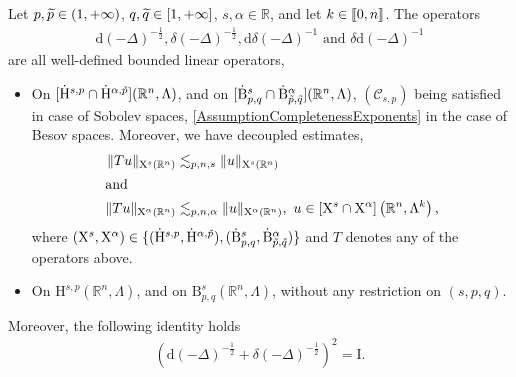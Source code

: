 \documentclass[AHL,Unicode,longabstracts,published]{cedram}
\newcommand{\bbR}{\mathbb{R}}
\newcommand{\rmH}{\mathrm{H}}%
\newcommand{\rmB}{\mathrm{B}}
\newcommand{\rmd}{\mathrm{d}}
\newcommand{\rmX}{\mathrm{X}}
\newcommand{\rmI}{\mathrm{I}}
\newcommand{\clC}{\mathcal{C}}
\newcommand{\llbracket}{\mathopen{[\mkern -2.7mu[}}
\newcommand{\rrbracket}{\mathclose{]\mkern -2.7mu]}}
\newcommand{\llb}{\llbracket}
\newcommand{\rrb}{\rrbracket}
\let\oldtilde\tilde
\renewcommand*{\tilde}[1]{\mathchoice{\widetilde{#1}}{\widetilde{#1}}{\oldtilde{#1}}{\oldtilde{#1}}}
\begin{document}
\begin{prop}\label{prop:RiesTransformHodgeRn}
Let $p,\Tilde{p}\in(1,+\infty)$, $q,\Tilde{q}\in[1,+\infty]$, $s,\alpha\in\bbR$, and let $k\in\llb 0,n\rrb$. The operators
\begin{align*}
\rmd(-\Delta)^{-\frac{1}{2}}, \delta(-\Delta)^{-\frac{1}{2}}, \rmd\delta(-\Delta)^{-1} \text{ and } \delta\rmd(-\Delta)^{-1}
\end{align*}
are all well-defined bounded linear operators,
\begin{itemize}
\item On $[\dot{\rmH}^{s,p}\cap \dot{\rmH}^{\alpha,\tilde{p}}](\bbR^n,\Lambda)$, and on $[\dot{\rmB}^{s}_{p,q}\cap \dot{\rmB}^{\alpha}_{\tilde{p},\tilde{q}}](\bbR^n,\Lambda)$, $(\clC_{s,p})$ being satisfied in case of Sobolev spaces, \eqref{AssumptionCompletenessExponents} in the case of Besov spaces. Moreover, we have decoupled estimates,
\begin{align*}
\| T u \|_{\rmX^s(\bbR^n)} &\lesssim_{p,n,s} \| u \|_{\rmX^s(\bbR^n)}\\
\intertext{and} 
\| T u \|_{\rmX^\alpha(\bbR^n)} &\lesssim_{p,n,\alpha} \| u \|_{\rmX ^\alpha(\bbR^n)}\text{, }\, u\in [\rmX^s\cap \rmX^\alpha]\left(\bbR^n,\Lambda^k\right)\text{,}
\end{align*}
where $(\rmX^s, \rmX^\alpha) \in\{ (\dot{\rmH}^{s,p},\dot{\rmH}^{\alpha,\tilde{p}}), (\dot{\rmB}^{s}_{p,q},\dot{\rmB}^{\alpha}_{\tilde{p},\tilde{q}})\}$ and $T$ denotes any of the operators above.
\item On ${\rmH}^{s,p}(\bbR^n,\Lambda)$, and on ${\rmB}^{s}_{p,q}(\bbR^n,\Lambda)$, without any restriction on $(s,p,q)$.
\end{itemize}
Moreover, the following identity holds
\begin{align*}
\left(\rmd(-\Delta)^{-\frac{1}{2}}+ \delta(-\Delta)^{-\frac{1}{2}}\right)^2 = \rmI .
\end{align*}
\end{prop}
\end{document}
